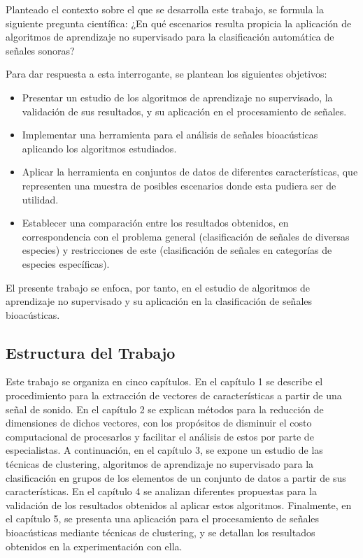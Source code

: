 Planteado el contexto sobre el que se desarrolla este trabajo, se formula la siguiente pregunta científica: ¿En qué escenarios resulta propicia la aplicación de algoritmos de aprendizaje no supervisado para la clasificación automática de señales sonoras?

Para dar respuesta a esta interrogante, se plantean los siguientes objetivos:
\begin{itemize}
    \item Presentar un estudio de los algoritmos de aprendizaje no supervisado, la validación de sus resultados, y su aplicación en el procesamiento de señales.
    \item Implementar una herramienta para el análisis de señales bioacústicas aplicando los algoritmos estudiados.
    \item Aplicar la herramienta en conjuntos de datos de diferentes características, que representen una muestra de posibles escenarios donde esta pudiera ser de utilidad.
    \item Establecer una comparación entre los resultados obtenidos, en correspondencia con el problema general (clasificación de señales de diversas especies) y restricciones de este (clasificación de señales en categorías de especies específicas).
\end{itemize}

El presente trabajo se enfoca, por tanto, en el estudio de algoritmos de aprendizaje no supervisado y su aplicación en la clasificación de señales bioacústicas.

\subsection*{Estructura del Trabajo}\label{subsec:estructuraDelTrabajo}

Este trabajo se organiza en cinco capítulos.
En el capítulo 1 se describe el procedimiento para la extracción de vectores de características a partir de una señal de sonido.
En el capítulo 2 se explican métodos para la reducción de dimensiones de dichos vectores, con los propósitos de disminuir el costo computacional de procesarlos y facilitar el análisis de estos por parte de especialistas.
A continuación, en el capítulo 3, se expone un estudio de las técnicas de clustering, algoritmos de aprendizaje no supervisado para la clasificación en grupos de los elementos de un conjunto de datos a partir de sus características.
En el capítulo 4 se analizan diferentes propuestas para la validación de los resultados obtenidos al aplicar estos algoritmos.
Finalmente, en el capítulo 5, se presenta una aplicación para el procesamiento de señales bioacústicas mediante técnicas de clustering, y se detallan los resultados obtenidos en la experimentación con ella.
